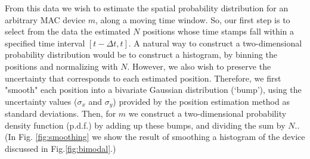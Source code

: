 \documentclass[10pt,a4paper]{article}
\begin{document}
From this data we wish to estimate the spatial probability distribution for an arbitrary MAC device $m$, along a moving time window.
So, our first step is to select from the data the estimated $N$ positions whose time stamps fall within a specified time interval $[t-\Delta t,t]$.
A natural way to construct a two-dimensional probability distribution would be to construct a histogram, by binning the positions and normalizing with $N$.
However, we also wish to preserve the uncertainty that corresponds to each estimated position.
Therefore, we first "smooth" each position into a bivariate Gaussian distribution (`bump'), using the uncertainty values ($\sigma_{x}$ and $\sigma_{y}$) provided by the position estimation method as standard deviations. Then, for  $m$ we construct a two-dimensional probability density function (p.d.f.) by adding up these bumps, and  dividing the sum by $N$.. (In Fig. \ref{fig:smoothing} we show the result of smoothing a histogram of the device discussed in Fig.\ref{fig:bimodal}.) %
\end{document}
